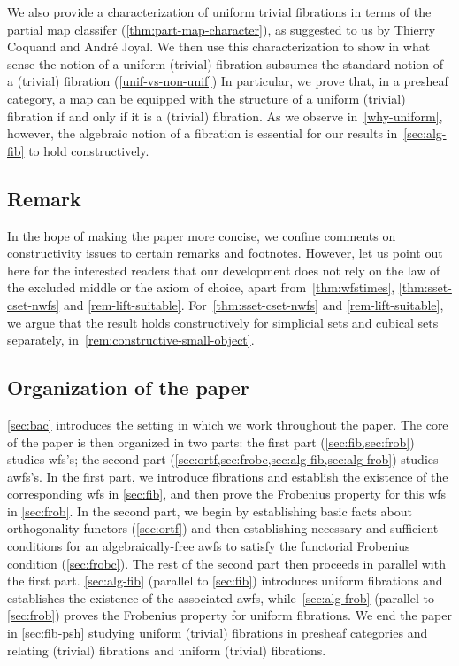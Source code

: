 \documentclass[reqno,10pt,a4paper,oneside,draft]{amsart}
\begin{document}
We also provide a characterization of uniform trivial fibrations in terms of the partial map classifer (\cref{thm:part-map-character}), as suggested to us by Thierry Coquand and Andr\'e Joyal.
We then use this characterization to show in what sense the notion of a uniform (trivial) fibration subsumes the standard notion of a (trivial) fibration (\cref{unif-vs-non-unif}) In particular, we prove that, in a presheaf category, a map can be equipped with the structure of a uniform (trivial) fibration if and only if it is a (trivial) fibration.
As we observe in~\cref{why-uniform}, however, the algebraic notion of a fibration is essential for our results in~\cref{sec:alg-fib} to hold constructively.

\subsection*{Remark}
In the hope of making the paper more concise, we confine comments on constructivity issues to certain remarks and footnotes.
However, let us point out here for the interested readers that our development does not rely on the law of the excluded middle or the axiom of choice, apart from~\cref{thm:wfstimes}, \cref{thm:sset-cset-nwfs} and \cref{rem-lift-suitable}.
For~\cref{thm:sset-cset-nwfs} and \cref{rem-lift-suitable}, we argue that the result holds constructively for simplicial sets and cubical sets separately, in~\cref{rem:constructive-small-object}.%

\subsection*{Organization of the paper} \cref{sec:bac} introduces the setting in which we work throughout the paper.
The core of the paper is then organized in two parts: the first part (\cref{sec:fib,sec:frob}) studies wfs's; the second part (\cref{sec:ortf,sec:frobc,sec:alg-fib,sec:alg-frob}) studies awfs's.
In the first part, we introduce fibrations and establish the existence of the corresponding wfs in \cref{sec:fib}, and then prove the Frobenius property for this wfs in \cref{sec:frob}.
In the second part, we begin by establishing basic facts about orthogonality functors (\cref{sec:ortf}) and then establishing necessary and sufficient conditions for an algebraically-free awfs to satisfy the functorial Frobenius condition (\cref{sec:frobc}).
The rest of the second part then proceeds in parallel with the first part.
\cref{sec:alg-fib} (parallel to \cref{sec:fib}) introduces uniform fibrations and establishes the existence of the associated awfs, while~\cref{sec:alg-frob} (parallel to \cref{sec:frob}) proves the Frobenius property for uniform fibrations.
We end the paper in \cref{sec:fib-psh} studying uniform (trivial) fibrations in presheaf categories and relating (trivial) fibrations and uniform (trivial) fibrations.
\end{document}
